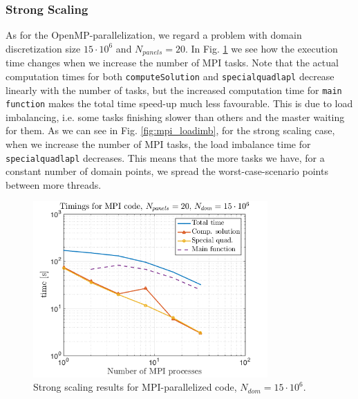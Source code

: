 \documentclass[a4paper,10pt]{article}
\def\code#1{\texttt{#1}}
\begin{document}
\subsubsection*{Strong Scaling}
As for the OpenMP-parallelization, we regard a problem with domain discretization size $15\cdot10^6$ and $N_{panels}=20$. In Fig. \ref{fig:mpi_strongtime} we see how the execution time changes when we increase the number of MPI tasks. Note that the actual computation times for both \code{computeSolution} and \code{specialquadlapl} decrease linearly with the number of tasks, but the increased computation time for \code{main function} makes the total time speed-up much less favourable. This is due to load imbalancing, i.e. some tasks finishing slower than others and the master waiting for them. As we can see in Fig. \ref{fig:mpi_loadimb}, for the strong scaling case, when we increase the number of MPI tasks, the load imbalance time for \code{specialquadlapl} decreases. This means that the more tasks we have, for a constant number of domain points, we spread the worst-case-scenario points between more threads. 
\begin{figure}[ht]
    \begin{center}
        \includegraphics[width=0.8\textwidth]{Graphics/craypat_mpi_strongscaling.png}
    \end{center}
    \caption{Strong scaling results for MPI-parallelized code, $N_{dom}=15\cdot 10^6$.}
    \label{fig:mpi_strongtime}
\end{figure}
\end{document}
